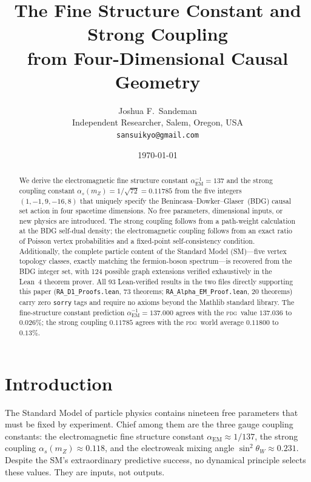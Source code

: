 \documentclass[11pt,twocolumn]{article}
\newcommand{\alphas}{\alpha_s}
\newcommand{\alphaEM}{\alpha_{\mathrm{EM}}}
\newcommand{\sinW}{\sin^2\!\theta_W}
\newcommand{\PDG}{\textsc{pdg}}
\begin{document}
\title{The Fine Structure Constant and Strong Coupling\\
from Four-Dimensional Causal Geometry}

\author{Joshua F.~Sandeman\\
\small Independent Researcher, Salem, Oregon, USA\\
\small \texttt{sansuikyo@gmail.com}}

\date{\today}

\begin{abstract}
We derive the electromagnetic fine structure constant
$\alphaEM^{-1} = 137$ and the strong coupling constant
$\alphas(m_Z) = 1/\!\sqrt{72} = 0.11785$ from the five integers
$(1,-1,9,-16,8)$ that uniquely specify the
Benincasa--Dowker--Glaser~(BDG) causal set action in four spacetime
dimensions.
No free parameters, dimensional inputs, or new physics are introduced.
The strong coupling follows from a path-weight calculation at the
BDG self-dual density; the electromagnetic coupling follows from an
exact ratio of Poisson vertex probabilities and a fixed-point
self-consistency condition.
Additionally, the complete particle content of the Standard Model
(SM)---five vertex topology classes, exactly matching the
fermion-boson spectrum---is recovered from the BDG integer set,
with 124 possible graph extensions verified exhaustively in the
Lean~4 theorem prover.
All 93 Lean-verified results in the two files directly supporting
this paper (\texttt{RA\_D1\_Proofs.lean}, 73 theorems;
\texttt{RA\_Alpha\_EM\_Proof.lean}, 20 theorems) carry zero
\texttt{sorry} tags and require no axioms beyond the Mathlib
standard library.
The fine-structure constant prediction $\alphaEM^{-1} = 137.000$
agrees with the \PDG\ value $137.036$ to $0.026\%$; the strong
coupling $0.11785$ agrees with the \PDG\ world average $0.11800$
to $0.13\%$.
\end{abstract}

\maketitle

\section{Introduction}

The Standard Model of particle physics contains nineteen free
parameters that must be fixed by experiment. Chief among them are
the three gauge coupling constants: the electromagnetic fine
structure constant $\alphaEM \approx 1/137$, the strong coupling
$\alphas(m_Z) \approx 0.118$, and the electroweak mixing angle
$\sinW \approx 0.231$. Despite the SM's extraordinary predictive
success, no dynamical principle selects these values. They are
inputs, not outputs.
\end{document}

